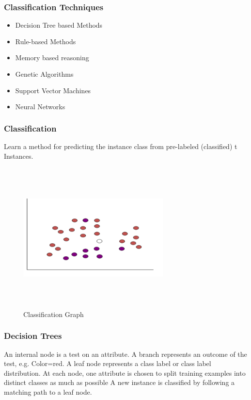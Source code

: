 \documentclass[a4paper,14pt,onecolumn]{article}
\begin{document}
  \subsubsection{ Classification Techniques}
 \begin{itemize}
\item Decision Tree based Methods
\item Rule-based Methods
\item Memory based reasoning
\item Genetic Algorithms
\item Support Vector Machines
\item Neural Networks 
\end{itemize}

\subsubsection{ Classification }
Learn a method for predicting the instance class from pre-labeled (classified) t  Instances.

\begin{figure}[hbp]
\begin{center}
\includegraphics[height=3in,width=3in]
{classficationGraph.jpg}  
\caption{Classification Graph}
\end{center}
\end{figure} 

\subsubsection{  Decision Trees  }
            An internal node is a test on an attribute. A branch represents an outcome of the test, e.g. Color=red. A leaf node represents a class label or class label distribution. At each node, one attribute is chosen to split training examples into distinct classes as much as possible A new instance is classified by following a matching path to a leaf node.
\end{document}
